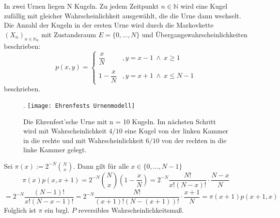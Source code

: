 In zwei Urnen liegen N Kugeln. Zu jedem Zeitpunkt $n \in \mathbb{N}$ wird eine Kugel zufällig mit gleicher Wahrscheinlichkeit ausgewählt, die die Urne dann wechselt. Die Anzahl der Kugeln in der ersten Urne wird durch die Markovkette $(X_{n})_{n \in \mathbb{N}_{0}}$ mit Zustandsraum $E = \lbrace 0,...,N \rbrace$ und Übergangswahrscheinlichkeiten beschrieben:
\begin{equation*}
p(x,y)=
\begin{cases}
\dfrac{x}{N} & , y = x - 1 \: \wedge \: x \geq 1\\
 &  \\
1 - \dfrac{x}{N} & , y = x + 1 \: \wedge \: x \leq N - 1
\end{cases}
\end{equation*}
beschrieben.
\begin{figure}[H].
\centering
\texttt{[image: Ehrenfests Urnenmodell]}
\caption{Die Ehrenfest'sche Urne mit n = 10 Kugeln. Im nächsten Schritt wird mit Wahrscheinlichkeit $4/10$ eine Kugel von der linken Kammer in die rechte und mit Wahrscheinlichkeit $6/10$ von der rechten in die linke Kammer gelegt.}
\end{figure}
\noindent
Sei $\pi(x) := 2^{-N} \binom{N}{x}$. Dann gilt für alle $x \in \lbrace 0,...,N-1 \rbrace$
\begin{equation*}
\pi(x)p(x,x+1) =  2^{-N} \binom{N}{x} \left( 1 - \dfrac{x}{N} \right) = 2^{-N} \dfrac{N!}{x!(N-x)!} \cdot \dfrac{N-x}{N}
\end{equation*}
\begin{equation*}
= 2^{-N} \dfrac{(N-1)!}{x!(N-x-1)!} = 2^{-N} \dfrac{N!}{(x+1)!(N-(x+1))! } \cdot \dfrac{x+1}{N} = \pi(x+1)p(x+1,x)
\end{equation*}
Folglich ist $\pi$ ein bzgl. $P$ reversibles Wahrscheinlichkeitsmaß.